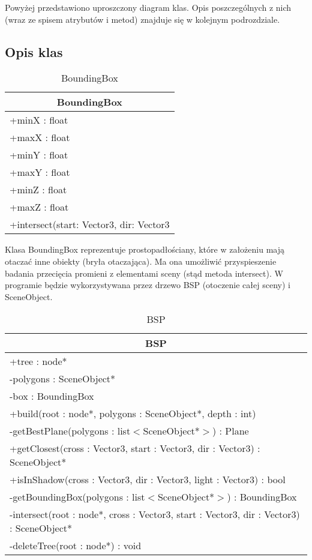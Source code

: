 	Powyżej przedstawiono uproszczony diagram klas. Opis poszczególnych z nich (wraz ze spisem atrybutów i metod) znajduje się w kolejnym podrozdziale.
	
\subsection{Opis klas}

\begin{longtable}{|p{16cm}|}
	\caption{BoundingBox} \label{tab:BoundingBox} \\ \hline
	\multicolumn{1}{|c|}{BoundingBox} \\ \hline
    +minX : float \\
    +maxX : float \\
    +minY : float \\
    +maxY : float \\
    +minZ : float \\
    +maxZ : float \\ \hline
    +intersect(start: Vector3, dir: Vector3 \\ \hline
\end{longtable}

Klasa BoundingBox reprezentuje prostopadłościany, które w założeniu mają otaczać inne obiekty (bryła otaczająca). Ma ona umożliwić przyspieszenie badania przecięcia promieni z elementami sceny (stąd metoda intersect). W programie będzie wykorzystywana przez drzewo BSP (otoczenie całej sceny) i SceneObject. 


\begin{longtable}{|p{16cm}|}
	\caption{BSP} \label{tab:BSP} \\ \hline
	\multicolumn{1}{|c|}{BSP} \\ \hline
    +tree : node* \\
    -polygons : SceneObject* \\
    -box : BoundingBox \\ \hline
    +build(root : node*, polygons : SceneObject*, depth : int) \\ 
	-getBestPlane(polygons : list$<$SceneObject*$>$) : Plane \\
	+getClosest(cross : Vector3, start : Vector3, dir : Vector3) : SceneObject* \\
	+isInShadow(cross : Vector3, dir : Vector3, light : Vector3) : bool \\
	-getBoundingBox(polygons : list$<$SceneObject*$>$) : BoundingBox \\
	-intersect(root : node*, cross : Vector3, start : Vector3, dir : Vector3) : SceneObject* \\
	-deleteTree(root : node*) : void \\
    \hline
\end{longtable}

